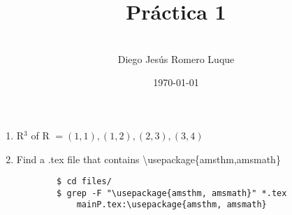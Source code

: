 \documentclass{article}
\title{\textbf{Pr\'actica 1}}
\author{\\Diego Jes\'us Romero Luque}
\date{\today}
\begin{document}
\maketitle

\pagebreak
\begin{enumerate}
    \item R$^3$ of R $= {(1,1),(1,2),(2,3),(3,4)}$
    \item Find a .tex file that contains \textbackslash usepackage\{amsthm,amsmath\} 
    \begin{verbatim}
        $ cd files/
        $ grep -F "\usepackage{amsthm, amsmath}" *.tex
            mainP.tex:\usepackage{amsthm, amsmath}
    \end{verbatim}
\end{enumerate}
\end{document}
